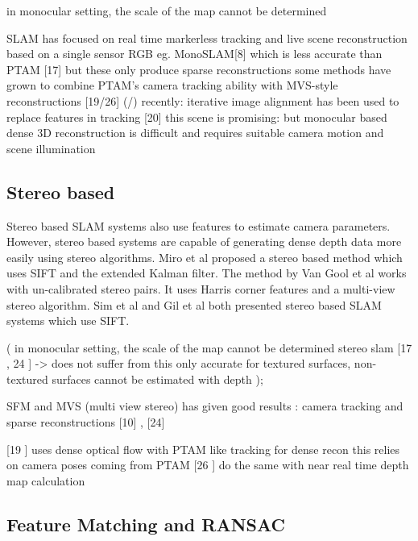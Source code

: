 in monocular setting, the scale of the map cannot be  determined \cite{Endres12Evaluation}

SLAM has focused on real time markerless tracking and live scene reconstruction based on a single sensor RGB eg. MonoSLAM[8] \cite{Davison03Real} which is less accurate than PTAM [17] \cite{Klein07Parallel}  but these only produce sparse reconstructions
some methods have grown to combine PTAM's camera tracking ability with MVS-style reconstructions [19/26] (\cite{Newcombe10Live}/\cite{Stuhmer10Real})
recently: iterative image alignment has been used to replace features in tracking [20] \cite{Newcombe11Dtam}
this scene is promising: but monocular based dense 3D reconstruction is difficult and requires suitable camera motion and scene illumination


\subsection{Stereo based}

Stereo based SLAM systems also use features to estimate camera parameters. However, stereo based systems are capable of generating dense depth data more easily using stereo algorithms. Miro et al \cite{Miro06Towards} proposed a stereo based method which uses SIFT and the extended Kalman filter. The method by Van Gool et al \cite{Pollefeys04Visual} works with un-calibrated stereo pairs. It uses Harris corner features and a multi-view stereo algorithm. Sim et al \cite{Sim05Vision} and Gil et al \cite{Gil06Improving} both presented stereo based SLAM systems which use SIFT.

\cite{Endres12Evaluation}(
in monocular setting, the scale of the map cannot be  determined 
stereo slam [17 \cite{Konolige08Outdoor}, 24 \cite{Paz08Large}] -> does not suffer from this
only accurate for textured surfaces, non-textured surfaces cannot be estimated with depth );

SFM and MVS (multi view stereo) has given good results : camera tracking  and sparse reconstructions [10] \cite{Fitzgibbon98Automatic}, \cite{Seitz06Comparison} [24] 


[19 \cite{Newcombe10Live}] uses dense optical flow with PTAM like tracking for dense recon
this relies on camera poses coming from PTAM
[26 \cite{Stuhmer10Real}] do the same with near real time depth map calculation


\subsection{Feature Matching and RANSAC}

